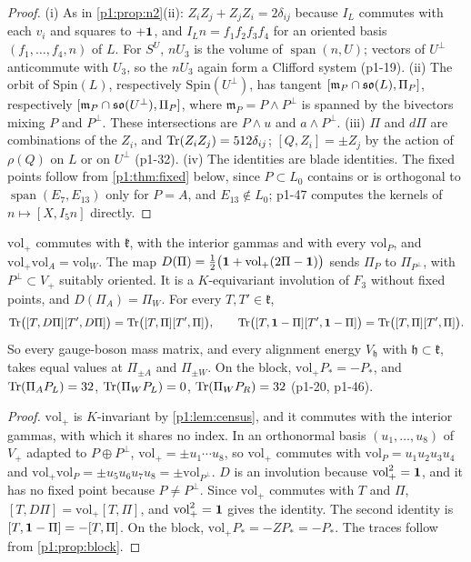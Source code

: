\begin{proof}
(i) As in \cref{p1:prop:n2}(ii): $Z_iZ_j+Z_jZ_i=2\delta_{ij}$ because $I_L$ commutes with each $v_i$ and squares to $+\mathbf 1$, and $I_Ln=f_1f_2f_3f_4$ for an oriented basis
$(f_1,\dots,f_4,n)$ of $L$. For $S^U$, $nU_3$ is the volume of $\operatorname{span}(n,U)$; vectors of $U^\perp$ anticommute with $U_3$, so the $nU_3$ again form a Clifford system
(p1-19). (ii) The orbit of $\mathrm{Spin}(L)$, respectively $\mathrm{Spin}(U^\perp)$, has tangent $[\mathfrak m_P\cap\mathfrak{so}(L),\Pi_P]$, respectively $[\mathfrak m_P\cap\mathfrak{so}(U^\perp),\Pi_P]$,
where $\mathfrak m_P=P\wedge P^\perp$ is spanned by the bivectors mixing $P$ and $P^\perp$. These intersections are $P\wedge u$ and $a\wedge P^\perp$. (iii) $\Pi$ and $d\Pi$ are
combinations of the $Z_i$, and $\operatorname{Tr}(Z_iZ_j)=512\delta_{ij}$; $[Q,Z_i]=\pm Z_j$ by the action of $\rho(Q)$ on $L$ or on $U^\perp$ (p1-32). (iv) The identities are blade
identities. The fixed points follow from \cref{p1:thm:fixed} below, since $P\subset L_0$ contains or is orthogonal to $\operatorname{span}(E_7,E_{13})$ only for $P=A$, and
$E_{13}\notin L_0$; p1-47 computes the kernels of $n\mapsto[X,I_5n]$ directly.
\end{proof}

\begin{proposition}
\label{p1:prop:duality}
$\mathrm{vol}_+$ commutes with $\mathfrak k$, with the interior gammas and with every $\mathrm{vol}_P$, and $\mathrm{vol}_+\mathrm{vol}_A=\mathrm{vol}_W$. The map
$D(\Pi)=\tfrac12\bigl(\mathbf 1+\mathrm{vol}_+(2\Pi-\mathbf 1)\bigr)$ sends $\Pi_P$ to $\Pi_{P^\perp}$, with $P^\perp\subset V_+$ suitably oriented. It is a $K$-equivariant involution of $F_3$
without fixed points, and $D(\Pi_A)=\Pi_W$. For every $T,T'\in\mathfrak k$,
\[
\operatorname{Tr}\bigl([T,D\Pi][T',D\Pi]\bigr)=\operatorname{Tr}\bigl([T,\Pi][T',\Pi]\bigr),\qquad \operatorname{Tr}\bigl([T,\mathbf 1-\Pi][T',\mathbf 1-\Pi]\bigr)=\operatorname{Tr}\bigl([T,\Pi][T',\Pi]\bigr).
\]
So every gauge-boson mass matrix, and every alignment energy $V_{\mathfrak h}$ with $\mathfrak h\subset\mathfrak k$, takes equal values at $\Pi_{\pm A}$ and $\Pi_{\pm W}$. On the
block, $\mathrm{vol}_+P_*=-P_*$, and $\operatorname{Tr}(\Pi_AP_L)=32$, $\operatorname{Tr}(\Pi_WP_L)=0$, $\operatorname{Tr}(\Pi_WP_R)=32$ (p1-20, p1-46).
\end{proposition}

\begin{proof}
$\mathrm{vol}_+$ is $K$-invariant by \cref{p1:lem:census}, and it commutes with the interior gammas, with which it shares no index. In an orthonormal basis $(u_1,\dots,u_8)$
of $V_+$ adapted to $P\oplus P^\perp$, $\mathrm{vol}_+=\pm u_1\cdots u_8$, so $\mathrm{vol}_+$ commutes with $\mathrm{vol}_P=u_1u_2u_3u_4$ and
$\mathrm{vol}_+\mathrm{vol}_P=\pm u_5u_6u_7u_8=\pm\mathrm{vol}_{P^\perp}$. $D$ is an involution because $\mathrm{vol}_+^2=\mathbf 1$, and it has no fixed point because $P\neq P^\perp$. Since $\mathrm{vol}_+$
commutes with $T$ and $\Pi$, $[T,D\Pi]=\mathrm{vol}_+[T,\Pi]$, and $\mathrm{vol}_+^2=\mathbf 1$ gives the identity. The second identity is $[T,\mathbf 1-\Pi]=-[T,\Pi]$. On the block,
$\mathrm{vol}_+P_*=-ZP_*=-P_*$. The traces follow from \cref{p1:prop:block}.
\end{proof}

